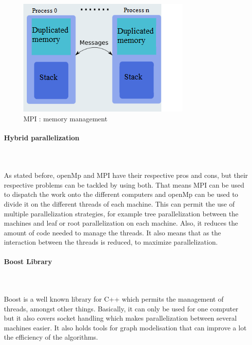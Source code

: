 \begin{figure}[!h] 
\centerline{\includegraphics[scale=0.85]{3_Software_considered/MultithreadingMP_boost_Visual_MPI_5000_Zotero_Project_Baptiste/MPI}}
   \caption{\label{étiquette} MPI : memory management}
\label{fig:MPI}
\end{figure}

\paragraph{Hybrid parallelization}\mbox{}\\\mbox{}\\

As stated before, openMp and MPI have their respective pros and cons, but their respective problems can be tackled by using both. That means MPI can be used to dispatch the work onto the different computers and openMp can be used to divide it on the different threads of each machine. This can permit the use of multiple parallelization strategies, for example tree parallelization between the machines and leaf or root parallelization on each machine. Also, it reduces the amount of code needed to manage the threads. It also means that as the interaction between the threads is reduced, to maximize parallelization.

\paragraph{Boost Library}\mbox{}\\\mbox{}\\

Boost is a well known library for C++ which permits the management of threads, amongst other things. Basically, it can only be used for one computer but it also covers socket handling which makes parallelization between several machines easier. It also holds tools for graph modelisation that can improve a lot the efficiency of the algorithms.

